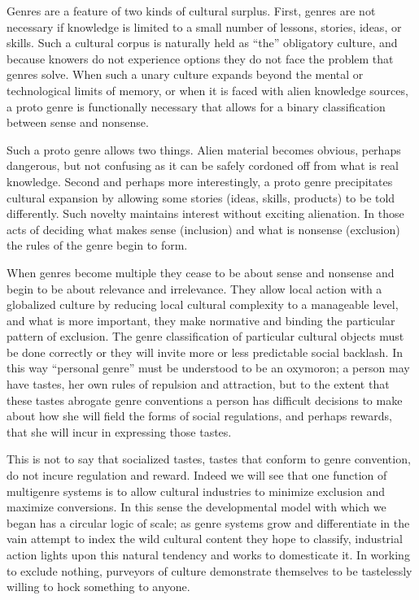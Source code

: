 \documentclass[]{book}
\theoremstyle{definition}
\theoremstyle{definition}
\theoremstyle{definition}
\theoremstyle{remark}
\begin{document}
Genres are a feature of two kinds of cultural surplus. First, genres are
not necessary if knowledge is limited to a small number of lessons,
stories, ideas, or skills. Such a cultural corpus is naturally held as
``the'' obligatory culture, and because knowers do not experience
options they do not face the problem that genres solve. When such a
unary culture expands beyond the mental or technological limits of
memory, or when it is faced with alien knowledge sources, a proto genre
is functionally necessary that allows for a binary classification
between sense and nonsense.

Such a proto genre allows two things. Alien material becomes obvious,
perhaps dangerous, but not confusing as it can be safely cordoned off
from what is real knowledge. Second and perhaps more interestingly, a
proto genre precipitates cultural expansion by allowing some stories
(ideas, skills, products) to be told differently. Such novelty maintains
interest without exciting alienation. In those acts of deciding what
makes sense (inclusion) and what is nonsense (exclusion) the rules of
the genre begin to form.

When genres become multiple they cease to be about sense and nonsense
and begin to be about relevance and irrelevance. They allow local action
with a globalized culture by reducing local cultural complexity to a
manageable level, and what is more important, they make normative and
binding the particular pattern of exclusion. The genre classification of
particular cultural objects must be done correctly or they will invite
more or less predictable social backlash. In this way ``personal genre''
must be understood to be an oxymoron; a person may have tastes, her own
rules of repulsion and attraction, but to the extent that these tastes
abrogate genre conventions a person has difficult decisions to make
about how she will field the forms of social regulations, and perhaps
rewards, that she will incur in expressing those tastes.

This is not to say that socialized tastes, tastes that conform to genre
convention, do not incure regulation and reward. Indeed we will see that
one function of multigenre systems is to allow cultural industries to
minimize exclusion and maximize conversions. In this sense the
developmental model with which we began has a circular logic of scale;
as genre systems grow and differentiate in the vain attempt to index the
wild cultural content they hope to classify, industrial action lights
upon this natural tendency and works to domesticate it. In working to
exclude nothing, purveyors of culture demonstrate themselves to be
tastelessly willing to hock something to anyone.
\end{document}
